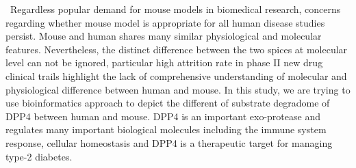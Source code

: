 \ Regardless popular demand for mouse models in biomedical research, concerns regarding whether mouse model is appropriate for all human disease studies persist. Mouse and human shares many similar physiological and molecular features. Nevertheless, the distinct difference between the two spices at molecular level can not be ignored, particular high attrition rate in phase II new drug clinical trails highlight the lack of comprehensive understanding of molecular and physiological difference between human and mouse. In this study, we are trying to use bioinformatics approach to depict the different of substrate degradome of DPP4 between human and mouse. DPP4 is an important exo-protease and regulates many important biological molecules including the immune system response, cellular homeostasis and DPP4 is a therapeutic target for managing type-2 diabetes. 
